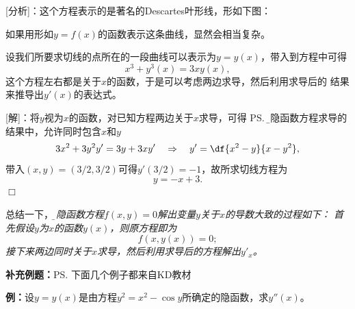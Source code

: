 [分析]：这个方程表示的是著名的{\kaishu Descartes叶形线}，形如下图：
\begin{center}
\end{center}
如果用形如$y=f(x)$的函数表示这条曲线，显然会相当复杂。

设我们所要求切线的点所在的一段曲线可以表示为$y=y(x)$，带入到方程中可得
$$x^3+y^3(x)=3xy(x),$$
这个方程左右都是关于$x$的函数，于是可以考虑两边求导，然后利用求导后的
结果来推导出$y'(x)$的表达式。

[解]：将$y$视为$x$的函数，对已知方程两边关于$x$求导，可得
\ps{\b 在隐函数方程求导的结果中，允许同时包含$x$和$y$}
$$3x^2+3y^2y'=3y+3xy'\quad\Rightarrow\quad
y'=\df{x^2-y}{x-y^2},$$
带入$(x,y)=(3/2,3/2)$可得$y'(3/2)=-1$，故所求切线方程为
$$y=-x+3.$$
\hfill$\Box$

总结一下，{\it\b 由隐函数方程$f(x,y)=0$解出变量$y$关于$x$的导数大致的过程如下：
首先假设$y$为$x$的函数$y(x)$，则原方程即为
$$f(x,y(x))=0;$$
接下来两边同时关于$x$求导，然后利用求导后的方程解出$y'_x$。}

{\bf 补充例题：}\ps{下面几个例子都来自KD教材}

{\bf 例：}设$y=y(x)$是由方程$y^2=x^2-\cos y$所确定的隐函数，求$y''(x)$。

\begin{center}
\end{center}

